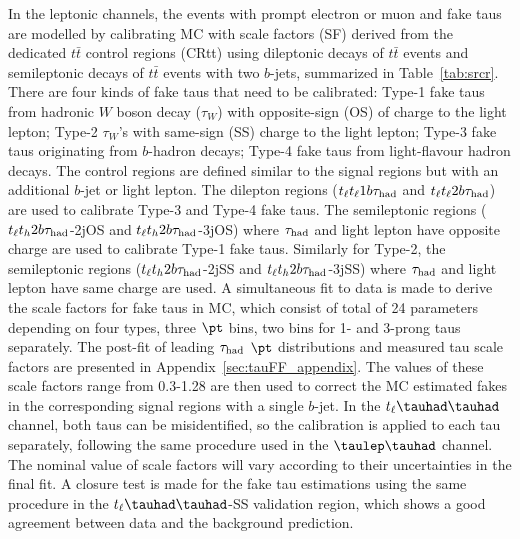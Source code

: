 In the leptonic channels, the events with prompt electron or muon and fake taus are modelled by calibrating MC with scale factors (SF)
derived from the dedicated $t\bar t$
control regions (CRtt) using dileptonic decays of $t\bar t$ events and semileptonic decays of $t\bar t$ events with two
$b$-jets, summarized in Table~\ref{tab:srcr}. 	
There are four kinds of fake taus that need to be calibrated: Type-1 fake taus from hadronic $W$ boson decay ($\tau_{W}$) %
with opposite-sign (OS) of charge to the light lepton;
Type-2 $\tau_{W}$'s with same-sign (SS) charge to the light lepton; Type-3 fake taus originating from $b$-hadron decays; Type-4 fake taus from light-flavour hadron decays.
The control regions are defined similar to the signal regions but with an additional $b$-jet or light lepton.
The dilepton regions ($t_{\ell}t_{\ell}1b\tau_\text{had}$ and $t_{\ell}t_{\ell}2b\tau_\text{had}$) are used to calibrate Type-3 and Type-4 fake taus. The semileptonic
regions ($t_{\ell}t_h2b\tau_\text{had}$-2jOS and $t_{\ell}t_h2b\tau_\text{had}$-3jOS) where $\tau_\text{had}$ and light lepton have opposite charge are used to calibrate Type-1 fake taus.
Similarly for Type-2, the semileptonic regions ($t_{\ell}t_h2b\tau_\text{had}$-2jSS and $t_{\ell}t_h2b\tau_\text{had}$-3jSS) where $\tau_\text{had}$ and light lepton have same charge are used.
A simultaneous fit to data is made to derive the scale factors for fake taus in MC, which consist of total of 24 parameters
depending on four types, three $\pt$ bins, two bins for 1- and 3-prong taus separately. The post-fit of leading $\tau_\text{had}$ $\pt$ distributions and measured tau scale factors are presented in Appendix~\ref{sec:tauFF_appendix}. 
The values of these scale factors range from 0.3-1.28 are then used to correct the MC estimated fakes in the corresponding  signal regions with a single $b$-jet.
In the $t_{\ell}\thadhad$ channel, both taus can be misidentified, so the calibration is applied to each tau separately, following the same procedure used in the $\tlhad$ channel.
The nominal value of scale factors will vary according to their uncertainties in the final fit. A closure test is made for the fake tau estimations using the same procedure
in the $t_{\ell}\thadhad$-SS validation region, which shows a good agreement between data and the background prediction. 

